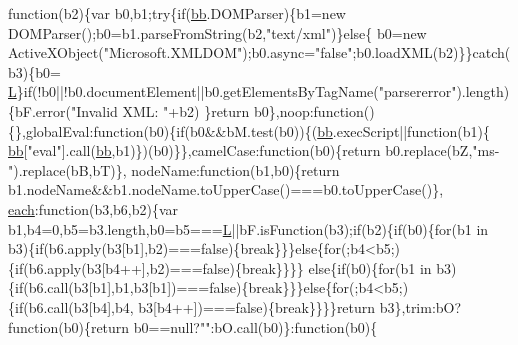 \begin{DoxyCode}
{      function}(b2)\{var b0,b1;\textcolor{keywordflow}{try}\{\textcolor{keywordflow}{if}(\hyperlink{jquery_8js_a1d6558865876e1c8cca029fce41a4bdb}{bb}.DOMParser)\{b1=\textcolor{keyword}{new} DOMParser();b0=b1.parseFromString(b2,\textcolor{stringliteral}{"text/xml"})\}\textcolor{keywordflow}{else}\{
      b0=\textcolor{keyword}{new} ActiveXObject(\textcolor{stringliteral}{"Microsoft.XMLDOM"});b0.async=\textcolor{stringliteral}{"false"};b0.loadXML(b2)\}\}\textcolor{keywordflow}{catch}(b3)\{b0=
      \hyperlink{jquery_8js_a38ee4c0b5f4fe2a18d0c783af540d253}{L}\}\textcolor{keywordflow}{if}(!b0||!b0.documentElement||b0.getElementsByTagName(\textcolor{stringliteral}{"parsererror"}).length)\{bF.error(\textcolor{stringliteral}{"Invalid XML: "}+b2)
      \}\textcolor{keywordflow}{return} b0\},noop:\textcolor{keyword}{function}()\{\},globalEval:\textcolor{keyword}{function}(b0)\{\textcolor{keywordflow}{if}(b0&&bM.test(b0))\{(\hyperlink{jquery_8js_a1d6558865876e1c8cca029fce41a4bdb}{bb}.execScript||\textcolor{keyword}{function}(b1)\{
      \hyperlink{jquery_8js_a1d6558865876e1c8cca029fce41a4bdb}{bb}[\textcolor{stringliteral}{"eval"}].call(\hyperlink{jquery_8js_a1d6558865876e1c8cca029fce41a4bdb}{bb},b1)\})(b0)\}\},camelCase:\textcolor{keyword}{function}(b0)\{\textcolor{keywordflow}{return} b0.replace(bZ,\textcolor{stringliteral}{"ms-"}).replace(bB,bT)\},
      nodeName:\textcolor{keyword}{function}(b1,b0)\{\textcolor{keywordflow}{return} b1.nodeName&&b1.nodeName.toUpperCase()===b0.toUpperCase()\},
      \hyperlink{jquery_8js_a871ff39db627c54c710a3e9909b8234c}{each}:\textcolor{keyword}{function}(b3,b6,b2)\{var b1,b4=0,b5=b3.length,b0=b5===\hyperlink{jquery_8js_a38ee4c0b5f4fe2a18d0c783af540d253}{L}||bF.isFunction(b3);\textcolor{keywordflow}{if}(b2)\{\textcolor{keywordflow}{if}(b0)\{\textcolor{keywordflow}{for}(b1 in 
      b3)\{\textcolor{keywordflow}{if}(b6.apply(b3[b1],b2)===\textcolor{keyword}{false})\{\textcolor{keywordflow}{break}\}\}\}\textcolor{keywordflow}{else}\{\textcolor{keywordflow}{for}(;b4<b5;)\{\textcolor{keywordflow}{if}(b6.apply(b3[b4++],b2)===\textcolor{keyword}{false})\{\textcolor{keywordflow}{break}\}\}\}\}\textcolor{keywordflow}{
      else}\{\textcolor{keywordflow}{if}(b0)\{\textcolor{keywordflow}{for}(b1 in b3)\{\textcolor{keywordflow}{if}(b6.call(b3[b1],b1,b3[b1])===\textcolor{keyword}{false})\{\textcolor{keywordflow}{break}\}\}\}\textcolor{keywordflow}{else}\{\textcolor{keywordflow}{for}(;b4<b5;)\{\textcolor{keywordflow}{if}(b6.call(b3[b4],b4,
      b3[b4++])===\textcolor{keyword}{false})\{\textcolor{keywordflow}{break}\}\}\}\}\textcolor{keywordflow}{return} b3\},trim:bO?\textcolor{keyword}{function}(b0)\{\textcolor{keywordflow}{return} b0==null?\textcolor{stringliteral}{""}:bO.call(b0)\}:\textcolor{keyword}{function}(b0)\{\textcolor{keywordflow}{
}
\end{DoxyCode}
